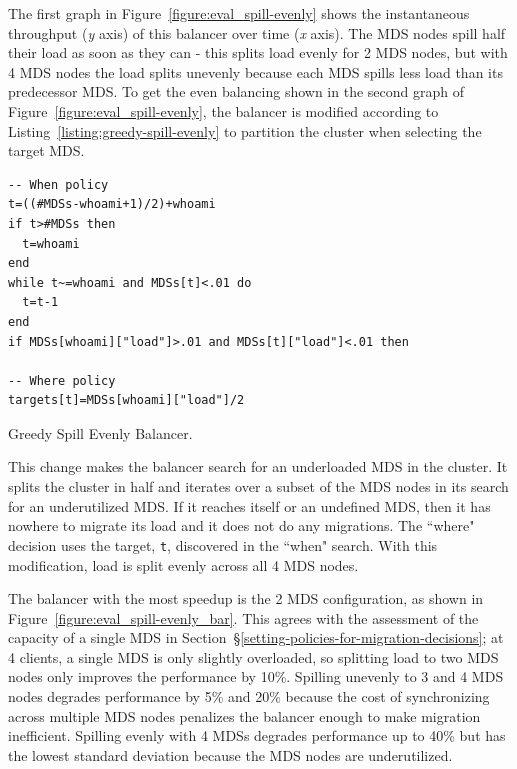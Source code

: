 The first graph in Figure~\ref{figure:eval_spill-evenly} shows the instantaneous throughput ({\it y} axis) of this balancer over time ({\it x} axis). The MDS nodes spill half their load as soon as they can - this splits load evenly for 2 MDS nodes, but with 4 MDS nodes the load splits unevenly because each MDS spills less load than its predecessor MDS. To get the even balancing shown in the second graph of Figure~\ref{figure:eval_spill-evenly}, the balancer is modified according to Listing~\ref{listing:greedy-spill-evenly} to partition the cluster when selecting the target MDS.
\begin{listing}
	\ssp
	\begin{verbatim}
-- When policy
t=((#MDSs-whoami+1)/2)+whoami
if t>#MDSs then 
  t=whoami
end
while t~=whoami and MDSs[t]<.01 do
  t=t-1
end
if MDSs[whoami]["load"]>.01 and MDSs[t]["load"]<.01 then

-- Where policy
targets[t]=MDSs[whoami]["load"]/2
	\end{verbatim}
	\dsp
    \caption{Greedy Spill Evenly Balancer.\label{listing:greedy-spill-evenly}}
\end{listing}

This change makes the balancer search for an underloaded MDS in the cluster. It splits the cluster in half and iterates over a subset of the MDS nodes in its search for an underutilized MDS. If it reaches itself or an undefined MDS, then it has nowhere to migrate its load and it does not do any migrations. The ``where" decision uses the target, \texttt{t}, discovered in the ``when" search. With this modification, load is split evenly across all 4 MDS nodes.

The balancer with the most speedup is the 2 MDS configuration, as shown in Figure~\ref{figure:eval_spill-evenly_bar}. This agrees with the assessment of the capacity of a single MDS in Section~\S\ref{setting-policies-for-migration-decisions}; at 4 clients, a single MDS is only slightly overloaded, so splitting load to two MDS nodes only improves the performance by 10\%. Spilling unevenly to 3 and 4 MDS nodes degrades performance by 5\% and 20\% because the cost of synchronizing across multiple MDS nodes penalizes the balancer enough to make migration inefficient. Spilling evenly with 4 MDSs degrades performance up to 40\%  but has the lowest standard deviation because the MDS nodes are underutilized.

